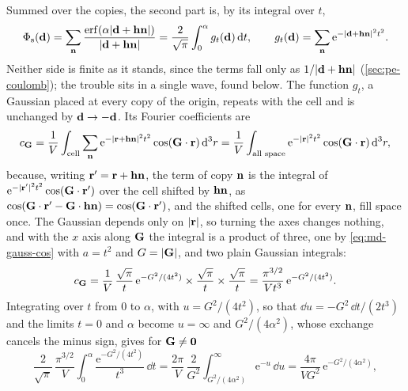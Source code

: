 Summed over the copies, the second part is, by its integral over $t$,
\begin{equation*}
   \Phi_{\mathrm s}(\bm{\mathrm{d}}) = \sum_{\bm{\mathrm{n}}}\frac{\operatorname{erf}(\alpha
   \lvert\bm{\mathrm{d}} + \bm{\mathrm{h}}\bm{\mathrm{n}}\rvert)}{\lvert\bm{\mathrm{d}} + \bm{\mathrm{h}}\bm{\mathrm{n}}\rvert}
   = \frac{2}{\sqrt\pi}\int_0^{\alpha}g_t(\bm{\mathrm{d}})\,\mathrm{d} t ,
   \qquad g_t(\bm{\mathrm{d}}) = \sum_{\bm{\mathrm{n}}}\mathrm{e}^{-\lvert\bm{\mathrm{d}} + \bm{\mathrm{h}}\bm{\mathrm{n}}
   \rvert^2t^2} .
\end{equation*}
Neither side is finite as it stands, since the terms fall only as
$1/\lvert\bm{\mathrm{d}} + \bm{\mathrm{h}}\bm{\mathrm{n}}\rvert$ (\cref{sec:pe-coulomb}); the trouble
sits in a single wave, found below. The function $g_t$, a Gaussian placed
at every copy of the origin, repeats with the cell and is unchanged by
$\bm{\mathrm{d}} \to -\bm{\mathrm{d}}$. Its Fourier coefficients are
\begin{equation*}
   c_{\bm{\mathrm{G}}} = \frac1V\int_{\text{cell}}\sum_{\bm{\mathrm{n}}}\mathrm{e}^{-\lvert
   \bm{\mathrm{r}} + \bm{\mathrm{h}}\bm{\mathrm{n}}\rvert^2t^2}\cos(\bm{\mathrm{G}}\cdot\bm{\mathrm{r}})\,\mathrm{d}^3r
   = \frac1V\int_{\text{all space}}\mathrm{e}^{-\lvert\bm{\mathrm{r}}\rvert^2t^2}
   \cos(\bm{\mathrm{G}}\cdot\bm{\mathrm{r}})\,\mathrm{d}^3r ,
\end{equation*}
because, writing $\bm{\mathrm{r}}' = \bm{\mathrm{r}} + \bm{\mathrm{h}}\bm{\mathrm{n}}$, the term of copy
$\bm{\mathrm{n}}$ is the integral of $\mathrm{e}^{-\lvert\bm{\mathrm{r}}'\rvert^2t^2}
\cos(\bm{\mathrm{G}}\cdot\bm{\mathrm{r}}')$ over the cell shifted by $\bm{\mathrm{h}}\bm{\mathrm{n}}$, as
$\cos(\bm{\mathrm{G}}\cdot\bm{\mathrm{r}}' - \bm{\mathrm{G}}\cdot\bm{\mathrm{h}}\bm{\mathrm{n}}) =
\cos(\bm{\mathrm{G}}\cdot\bm{\mathrm{r}}')$, and the shifted cells, one for every $\bm{\mathrm{n}}$,
fill space once. The Gaussian depends only on $\lvert\bm{\mathrm{r}}\rvert$, so
turning the axes changes nothing, and with the $x$ axis along $\bm{\mathrm{G}}$ the
integral is a product of three, one by \cref{eq:md-gauss-cos} with $a =
t^2$ and $G = \lvert\bm{\mathrm{G}}\rvert$, and two plain Gaussian integrals:
\begin{equation*}
   c_{\bm{\mathrm{G}}} = \frac1V\,\frac{\sqrt\pi}{t}\,\mathrm{e}^{-G^2/(4t^2)}
   \times\frac{\sqrt\pi}{t}\times\frac{\sqrt\pi}{t}
   = \frac{\pi^{3/2}}{Vt^3}\,\mathrm{e}^{-G^2/(4t^2)} .
\end{equation*}
Integrating over $t$ from 0 to $\alpha$, with $u = G^2/(4t^2)$, so that
$\dd u = -G^2\,\dd t/(2t^3)$ and the limits $t = 0$ and $\alpha$ become $u
= \infty$ and $G^2/(4\alpha^2)$, whose exchange cancels the minus sign,
gives for $\bm{\mathrm{G}} \neq \bm{\mathrm{0}}$
\begin{equation*}
   \frac{2}{\sqrt\pi}\,\frac{\pi^{3/2}}{V}\int_0^{\alpha}\frac{\mathrm{e}^{
   -G^2/(4t^2)}}{t^3}\,\dd t
   = \frac{2\pi}{V}\,\frac{2}{G^2}\int_{G^2/(4\alpha^2)}^{\infty}
   \mathrm{e}^{-u}\,\dd u
   = \frac{4\pi}{VG^2}\,\mathrm{e}^{-G^2/(4\alpha^2)} ,
\end{equation*}
